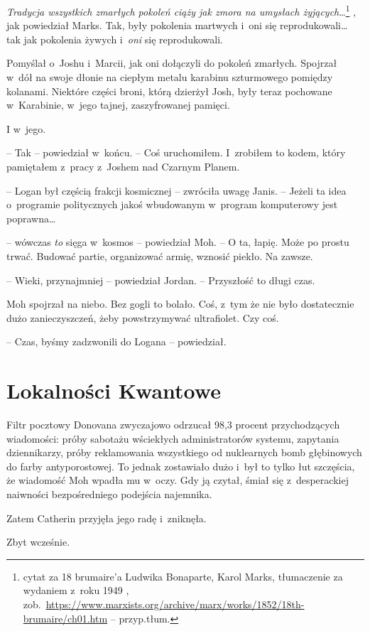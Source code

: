 \documentclass[oneside,polish,11pt,sfheadings]{mwbk}
\begin{document}
\emph{Tradycja wszystkich zmarłych pokoleń ciąży jak zmora na umysłach
żyjących}\ldots\footnote{cytat za 18 brumaire'a Ludwika
Bonaparte, Karol Marks, tłumaczenie za wydaniem z~roku 1949 ,
zob.~\url{https://www.marxists.org/archive/marx/works/1852/18th-brumaire/ch01.htm}
-- przyp.tłum.} , jak powiedział Marks. Tak, były pokolenia martwych i~oni się reprodukowali\ldots
tak jak pokolenia żywych i~\emph{oni} się reprodukowali.

Pomyślał o~Joshu i~Marcii, jak oni dołączyli do pokoleń zmarłych.
Spojrzał w~dół na swoje dłonie na ciepłym metalu karabinu szturmowego
pomiędzy kolanami. Niektóre części broni, którą dzierżył Josh, były
teraz pochowane w~Karabinie, w~jego tajnej, zaszyfrowanej pamięci.

I w~jego.

-- Tak -- powiedział w~końcu. -- Coś uruchomiłem. I~zrobiłem to kodem,
który pamiętałem z~pracy z~Joshem nad Czarnym Planem.

-- Logan był częścią frakcji kosmicznej -- zwróciła uwagę Janis. -- Jeżeli
ta idea o~programie politycznych jakoś wbudowanym w~program komputerowy
jest poprawna\ldots

-- wówczas \emph{to} sięga w~kosmos -- powiedział Moh. -- O ta, łapię. Może
po prostu trwać. Budować partie, organizować armię, wznosić piekło. Na
zawsze.

-- Wieki, przynajmniej -- powiedział Jordan. -- Przyszłość to długi czas.

Moh spojrzał na niebo. Bez gogli to bolało. Coś, z~tym że nie było
dostatecznie dużo zanieczyszczeń, żeby powstrzymywać ultrafiolet. Czy
coś.

-- Czas, byśmy zadzwonili do Logana -- powiedział.

\chapter{Lokalności Kwantowe}


Filtr pocztowy Donovana zwyczajowo odrzucał 98,3 procent przychodzących
wiadomości: próby sabotażu wściekłych administratorów systemu, zapytania
dziennikarzy, próby reklamowania wszystkiego od nuklearnych bomb
głębinowych do farby antyporostowej. To jednak zostawiało dużo i~był to
tylko łut szczęścia, że wiadomość Moh wpadła mu w~oczy. Gdy ją czytał,
śmiał się z~desperackiej naiwności bezpośredniego podejścia najemnika.

Zatem Catherin przyjęła jego radę i~zniknęła.

Zbyt wcześnie.
\end{document}
